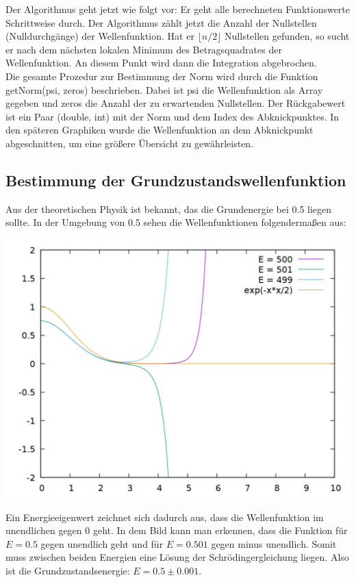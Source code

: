 \documentclass{scrreprt}
\begin{document}
Der Algorithmus geht jetzt wie folgt vor: Er geht alle berechneten Funktionswerte Schrittweise durch. Der Algorithmus zählt jetzt die Anzahl der Nullstellen (Nulldurchgänge) der Wellenfunktion. Hat er $\lfloor n/2\rfloor$ Nullstellen gefunden, so sucht er nach dem nächsten lokalen Minimum des Betragsquadrates der Wellenfunktion. An diesem Punkt wird dann die Integration abgebrochen.\\

Die gesamte Prozedur zur Bestimmung der Norm wird durch die Funktion getNorm(psi, zeros) beschrieben. Dabei ist psi die Wellenfunktion als Array gegeben und zeros die Anzahl der zu erwartenden Nullstellen. Der Rückgabewert ist ein Paar (double, int) mit der Norm und dem Index des Abknickpunktes. In den späteren Graphiken wurde die Wellenfunktion an dem Abknickpunkt abgeschnitten, um eine größere Übersicht zu gewährleisten.

\subsection*{Bestimmung der Grundzustandswellenfunktion}
Aus der theoretischen Physik ist bekannt, das die Grundenergie bei 0.5 liegen sollte. In der Umgebung von 0.5 sehen die Wellenfunktionen folgendermaßen aus:

\begin{center}
\includegraphics[scale=0.3]{aufgabe3/plot_ground.png}
\end{center}

Ein Energieeigenwert zeichnet sich dadurch aus, dass die Wellenfunktion im unendlichen gegen 0 geht. In dem Bild kann man erkennen, dass die Funktion für $E=0.5$ gegen unendlich geht und für $E = 0.501$ gegen minus unendlich. Somit muss zwischen beiden Energien eine Lösung der Schrödingergleichung liegen. Also ist die Grundzustandsenergie: $E = 0.5 \pm 0.001$.\\
\end{document}
